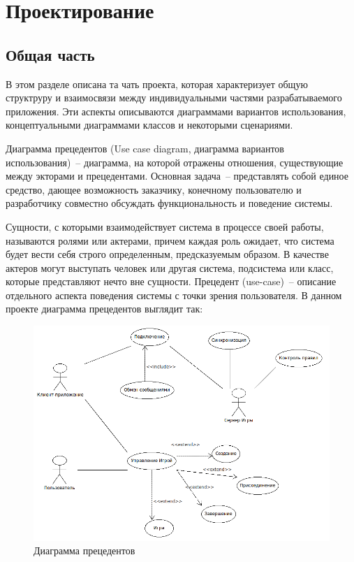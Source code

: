 ﻿\section{Проектирование}
\subsection{Общая часть}
В этом разделе описана та чать проекта, которая характеризует общую структруру и взаимосвязи между индивидуальными частями разрабатываемого приложения.
Эти аспекты описываются диаграммами вариантов использования, концептуальными диаграммами классов и некоторыми сценариями.

Диаграмма прецедентов (Use case diagram, диаграмма вариантов использования)~-- диаграмма, на которой отражены отношения, 
существующие между экторами и прецедентами.
Основная задача~-- представлять собой единое средство, дающее возможность заказчику, конечному пользователю и разработчику совместно
обсуждать функциональность и поведение системы.

Сущности, с которыми взаимодействует система в процессе своей работы, называются ролями или актерами, причем каждая роль ожидает, 
что система будет вести себя строго определенным, предсказуемым образом. В качестве актеров могут выступать человек или 
другая система, подсистема или класс, которые представляют нечто вне сущности.
Прецедент (use-case)~-- описание отдельного аспекта поведения системы с точки зрения пользователя.
В данном проекте диаграмма прецедентов выглядит так:

\begin{figure}[ht]
\centering
\includegraphics[width=18cm]{images/use.png}
\caption{Диаграмма прецедентов}
\label{fig0}
\end{figure}

